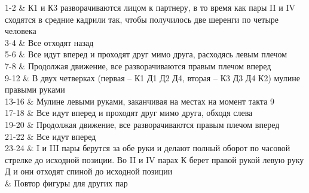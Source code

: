 {{1-2 & К1 и К3 разворачиваются лицом к партнеру, в то время как пары II и IV сходятся в средние кадрили так, чтобы получилось две шеренги по четыре человека\\

3-4 & Все отходят назад\\

5-6 & Все идут вперед и проходят друг мимо друга, расходясь левым плечом\\

7-8 & Продолжая движение, все разворачиваются правым плечом вперед\\

9-12 & В двух четверках (первая -- К1 Д1 Д2 Д4, вторая -- К3 Д3 Д4 К2) мулине правыми руками\\

13-16 & Мулине левыми руками, заканчивая на местах на момент такта 9\\

17-18 & Все идут вперед и проходят друг мимо друга, обходя слева\\

19-20 & Продолжая движение, все разворачиваются правым плечом вперед\\

21-22 & Все идут вперед\\

23-24 & I и III пары берутся за обе руки и делают полный оборот по часовой стрелке до исходной позиции. Во II и IV парах К берет правой рукой левую руку Д и они отходят спиной до исходной позиции\\

& Повтор фигуры для других пар\\
}
}